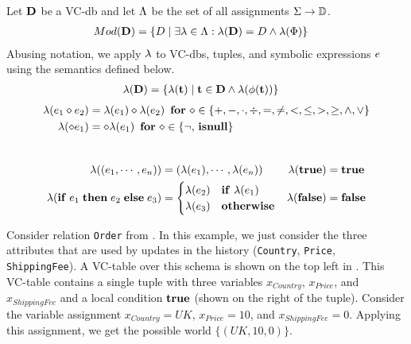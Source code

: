 \begin{defi}[$\worldsOf{\vcdb}$]\label{def:vcdb-worlds}
  Let $\mathbf{D}$ be a VC-db and let $\Lambda$ be the set of all assignments $\Sigma \to \mathbb{D}$.
  \begin{align*}
Mod({\mathbf{D}}) &= \{ D \mid \exists \lambda \in \Lambda: \lambda(\mathbf{D}) = D \land \lambda(\Phi)\}
  \end{align*}
Abusing notation, we apply $\lambda$ to VC-dbs, tuples, and symbolic expressions $e$ using the semantics defined below.
  \begin{align*}
\lambda(\mathbf{D}) &= \{ \lambda(\mathbf{t}) \mid \mathbf{t} \in \mathbf{D} \land \lambda(\phi(\mathbf{t})) \}
  \end{align*}
  \begin{align*}
        \lambda(e_1 \diamond e_2) &= \lambda(e_1) \diamond \lambda(e_2) \,\,\,\text{\textbf{for}}\,\, \diamond \in \{+,-,\cdot,\div,=,\neq,<,\leq,>,\geq,\land,\lor\}\\
        \lambda(\diamond e_1) &= \diamond \lambda(e_1)
    \,\,\,\text{\textbf{for}}\,\, \diamond \in \{\neg, \,\mathbf{isnull}\}
  \end{align*}\\[-9mm]
  \begin{align*}
    \lambda( (e_1, \cdots, e_n)) &= (\lambda(e_1), \cdots, \lambda(e_n))     &\lambda(\mathbf{true}) &= \mathbf{true}  \\
        \lambda(\mathbf{if}\thickspace e_1 \thickspace \mathbf{then} \thickspace e_2 \thickspace \mathbf{else} \thickspace e_3) &=
                                          \begin{cases}
                                            \lambda(e_2) &\mathbf{if}\,\,\lambda(e_1)\\
                                            \lambda(e_3) &\mathbf{otherwise}\\
                                          \end{cases}
    &\lambda(\mathbf{false}) &= \mathbf{false}\\
  \end{align*}
\end{defi}


%
%
%
%
%
%
\begin{exam}
\label{ex:pw-example}
Consider relation \texttt{Order} from . In this example, we just consider the three attributes that are used by updates in the history (\texttt{Country}, \texttt{Price}, \texttt{ShippingFee}).
A VC-table over this schema is shown on the top left in . This VC-table contains a single tuple with three variables $x_{Country}$, $x_{Price}$, and $x_{ShippingFee}$ and a local condition $\mathbf{true}$ (shown on the right of the tuple). Consider the variable assignment $x_{Country} = UK$, $x_{Price} = 10$, and $x_{ShippingFee} = 0$. Applying this assignment, we get the  possible world  $\{(UK, 10, 0)\}$.
%
%
\end{exam}

